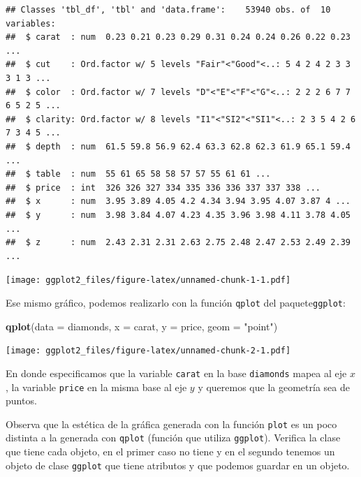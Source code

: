 \documentclass[]{article}
\newenvironment{Shaded}{\begin{snugshade}}{\end{snugshade}}
\newcommand{\KeywordTok}[1]{\textcolor[rgb]{0.13,0.29,0.53}{\textbf{#1}}}
\newcommand{\DataTypeTok}[1]{\textcolor[rgb]{0.13,0.29,0.53}{#1}}
\newcommand{\StringTok}[1]{\textcolor[rgb]{0.31,0.60,0.02}{#1}}
\newcommand{\OperatorTok}[1]{\textcolor[rgb]{0.81,0.36,0.00}{\textbf{#1}}}
\newcommand{\NormalTok}[1]{#1}
\begin{document}
\begin{verbatim}
## Classes 'tbl_df', 'tbl' and 'data.frame':    53940 obs. of  10 variables:
##  $ carat  : num  0.23 0.21 0.23 0.29 0.31 0.24 0.24 0.26 0.22 0.23 ...
##  $ cut    : Ord.factor w/ 5 levels "Fair"<"Good"<..: 5 4 2 4 2 3 3 3 1 3 ...
##  $ color  : Ord.factor w/ 7 levels "D"<"E"<"F"<"G"<..: 2 2 2 6 7 7 6 5 2 5 ...
##  $ clarity: Ord.factor w/ 8 levels "I1"<"SI2"<"SI1"<..: 2 3 5 4 2 6 7 3 4 5 ...
##  $ depth  : num  61.5 59.8 56.9 62.4 63.3 62.8 62.3 61.9 65.1 59.4 ...
##  $ table  : num  55 61 65 58 58 57 57 55 61 61 ...
##  $ price  : int  326 326 327 334 335 336 336 337 337 338 ...
##  $ x      : num  3.95 3.89 4.05 4.2 4.34 3.94 3.95 4.07 3.87 4 ...
##  $ y      : num  3.98 3.84 4.07 4.23 4.35 3.96 3.98 4.11 3.78 4.05 ...
##  $ z      : num  2.43 2.31 2.31 2.63 2.75 2.48 2.47 2.53 2.49 2.39 ...
\end{verbatim}

\begin{Shaded}
\end{Shaded}

\texttt{[image: ggplot2\_files/figure-latex/unnamed-chunk-1-1.pdf]}

Ese mismo gráfico, podemos realizarlo con la función \texttt{qplot} del
paquete\texttt{ggplot}:

\begin{Shaded}
\begin{Highlighting}[]
\KeywordTok{qplot}\NormalTok{(}\DataTypeTok{data =}\NormalTok{ diamonds, }\DataTypeTok{x =}\NormalTok{ carat, }\DataTypeTok{y =}\NormalTok{ price, }\DataTypeTok{geom =} \StringTok{"point"}\NormalTok{)}
\end{Highlighting}
\end{Shaded}

\texttt{[image: ggplot2\_files/figure-latex/unnamed-chunk-2-1.pdf]}

En donde especificamos que la variable \texttt{carat} en la base
\texttt{diamonds} mapea al eje \(x\), la variable \texttt{price} en la
misma base al eje \(y\) y queremos que la geometría sea de puntos.

Observa que la estética de la gráfica generada con la función
\texttt{plot} es un poco distinta a la generada con \texttt{qplot}
(función que utiliza \texttt{ggplot}). Verifica la clase que tiene cada
objeto, en el primer caso no tiene y en el segundo tenemos un objeto de
clase \texttt{ggplot} que tiene atributos y que podemos guardar en un
objeto.
\end{document}
